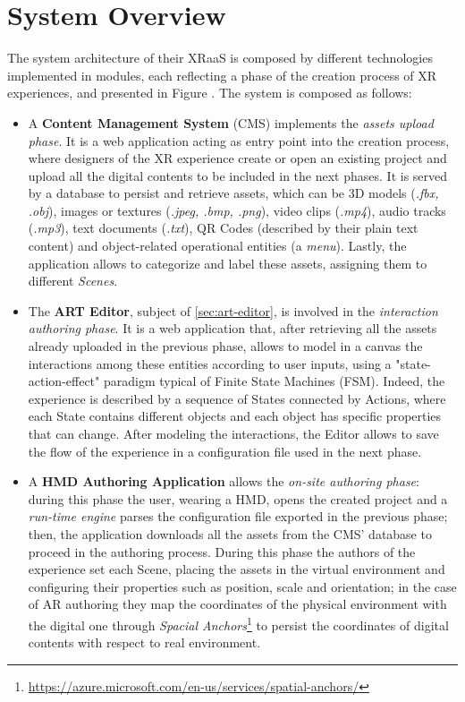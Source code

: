 \section{System Overview}
\label{sec:art-overview}

The system architecture of their XRaaS is composed by different technologies implemented in modules, each reflecting a phase of the creation process of \gls{XR} experiences, and presented in Figure . The system is composed as follows:
\begin{itemize}
    \item A \textbf{Content Management System} (CMS) implements the \emph{assets upload phase}. It is a web application acting as entry point into the creation process, where designers of the \gls{XR} experience create or open an existing project and upload all the digital contents to be included in the next phases. It is served by a database to persist and retrieve assets, which can be 3D models (\textit{.fbx, .obj}), images or textures (\textit{.jpeg, .bmp, .png}), video clips (\textit{.mp4}), audio tracks (\textit{.mp3}), text documents (\textit{.txt}), QR Codes (described by their plain text content) and object-related operational entities (a \textit{menu}). Lastly, the application allows to categorize and label these assets, assigning them to different \emph{Scenes}.

    \item The \textbf{ART Editor}, subject of \autoref{sec:art-editor}, is involved in the \emph{interaction authoring phase}. It is a web application that, after retrieving all the assets already uploaded in the previous phase, allows to model in a canvas the interactions among these entities according to user inputs, using a "state-action-effect" paradigm typical of Finite State Machines (FSM). Indeed, the experience is described by a sequence of States connected by Actions, where each State contains different objects and each object has specific properties that can change. After modeling the interactions, the Editor allows to save the flow of the experience in a configuration file used in the next phase.
    
    \item A \textbf{\gls{HMD} Authoring Application} allows the \emph{on-site authoring phase}: during this phase the user, wearing a \gls{HMD}, opens the created project and a \emph{run-time engine} parses the configuration file exported in the previous phase; then, the application downloads all the assets from the CMS' database to proceed in the authoring process. During this phase the authors of the experience set each Scene, placing the assets in the virtual environment and configuring their properties such as position, scale and orientation; in the case of \gls{AR} authoring they map the coordinates of the physical environment with the digital one through \emph{Spacial Anchors}\footnote{\url{https://azure.microsoft.com/en-us/services/spatial-anchors/}} to persist the coordinates of digital contents with respect to real environment. 
    

\end{itemize}
